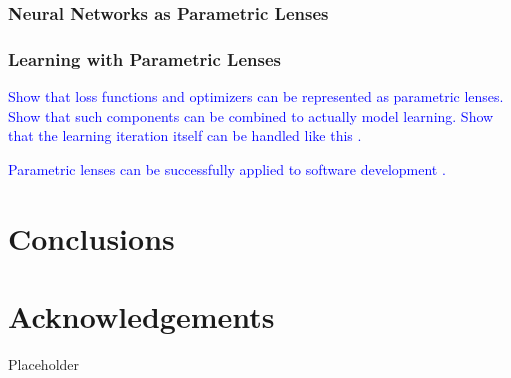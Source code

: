\documentclass[12pt,a4paper,openright,twoside]{report}
\theoremstyle{plain}
\theoremstyle{definition}
\begin{document}
\subsection{Neural Networks as Parametric Lenses}





\subsection{Learning with Parametric Lenses}

\textcolor{blue}{Show that loss functions and optimizers can be represented as parametric lenses. Show that such components can be combined to actually model learning. Show that the learning iteration itself can be handled like this \cite{cruttwellDeepLearningParametric}.}

\textcolor{blue}{Parametric lenses can be successfully applied to software development \cite{cruttwellDeepLearningParametric}.}










\chapter*{Conclusions}




















\chapter*{Acknowledgements}

\thispagestyle{empty}

  Placeholder 
\end{document}
